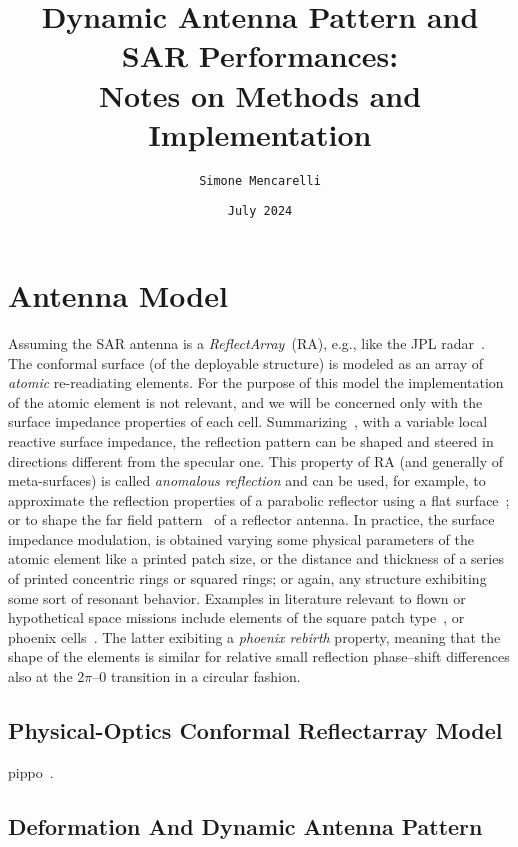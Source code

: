 \documentclass[11pt, a4paper]{scrartcl}
\title{Dynamic Antenna Pattern and SAR Performances: \\Notes on Methods and Implementation}
\author{\texttt{Simone Mencarelli}}
\date{\small{\texttt{July 2024}}}
\begin{document}
    \maketitle


    \section{Antenna Model}
    \label{sec:antenna_model}
    Assuming the SAR antenna is a \emph{ReflectArray}~(RA), e.g., like the JPL radar~\cite{swot}.
    The conformal surface (of the deployable structure) is modeled as an array of \emph{atomic} re-readiating elements.
    For the purpose of this model the implementation of the atomic element is not relevant, and we will be concerned only
    with the surface impedance properties of each cell.
    Summarizing~\cite{MetaTutorialLiu2023}, with a variable local reactive surface impedance, the reflection pattern can
    be shaped and steered in directions different from the specular one.
    This property of RA (and generally of meta-surfaces) is called \emph{anomalous reflection} and can be used, for example, to approximate the reflection properties
    of a parabolic reflector using a flat surface~\cite{rapozar}; or to shape the far field pattern~\cite{Guarrielllo} of a reflector antenna.
    In practice, the surface impedance modulation, is obtained varying some physical parameters of the atomic element
    like a printed patch size, or the distance and thickness of a series of printed concentric rings or squared rings;
    or again, any structure exhibiting some sort of resonant behavior.
    Examples in literature relevant to flown or hypothetical space missions include elements of the square patch
    type~\cite{swot,marco,isara}, or phoenix cells~\cite{Guarrielllo,secondphoenix}.
    The latter exibiting a \emph{phoenix rebirth} property, meaning that the shape of the elements is similar for
    relative small reflection phase--shift differences also at the 2$\pi$--0 transition in a circular fashion.

    \subsection{Physical-Optics Conformal Reflectarray Model}
    \label{subsec:physical_optics_conformal_reflectarray_model}
    pippo~\cite{PradoCrosspolar2017}.

    \subsection{Deformation And Dynamic Antenna Pattern}
    \label{subsec:deformation_model}
\end{document}
